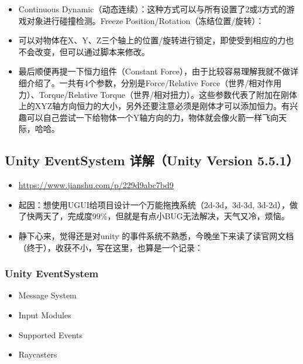 \documentclass[9pt, b5paper]{article}
\begin{document}
\begin{itemize}
\item Continuous Dynamic（动态连续）：这种方式可以与所有设置了2或3方式的游戏对象进行碰撞检测。Freeze Position/Rotation（冻结位置/旋转）：
\item 可以对物体在X、Y、Z三个轴上的位置/旋转进行锁定，即使受到相应的力也不会改变，但可以通过脚本来修改。
\item 最后顺便再提一下恒力组件（Constant Force），由于比较容易理解我就不做详细介绍了。一共有4个参数，分别是Force/Relative Force（世界/相对作用力）、Torque/Relative Torque（世界/相对扭力）。这些参数代表了附加在刚体上的XYZ轴方向恒力的大小，另外还要注意必须是刚体才可以添加恒力。有兴趣可以自己尝试一下给物体一个Y轴方向的力，物体就会像火箭一样飞向天际，哈哈。
\end{itemize}
\subsection{Unity EventSystem 详解（Unity Version 5.5.1）}
\label{sec:orgd14fe7b}
\begin{itemize}
\item \url{https://www.jianshu.com/p/229d9abc7bd9}
\item 起因：想使用UGUI给项目设计一个万能拖拽系统（2d-3d，3d-3d, 3d-2d），做了快两天了，完成度99\%，但就是有点小BUG无法解决，天气又冷，烦恼。
\item 静下心来，觉得还是对unity 的事件系统不熟悉，今晚坐下来读了读官网文档（终于），收获不小，写在这里，也算是一个记录：
\end{itemize}
\subsubsection{Unity EventSystem}
\label{sec:org155963f}
\begin{itemize}
\item Message System
\item Input Modules
\item Supported Events
\item Raycasters
\end{itemize}
\end{document}
